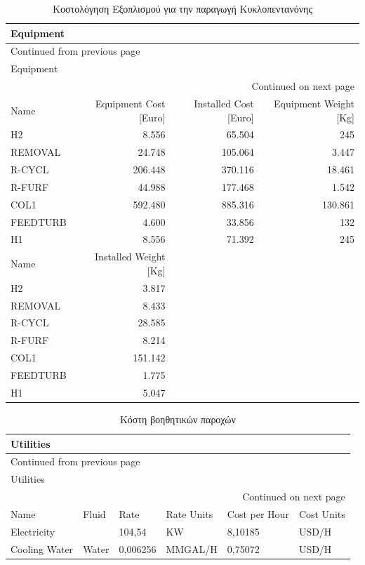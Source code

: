 \documentclass[11pt]{article}
\begin{document}
\begin{longtable}{lrrr}
\caption{Κοστολόγηση Εξοπλισμού για την παραγωγή Κυκλοπεντανόνης}
\\
Equipment &  &  & \\
\hline
\endfirsthead
\multicolumn{4}{l}{Continued from previous page} \\
\hline

Equipment &  &  &  \\

\hline
\endhead
\hline\multicolumn{4}{r}{Continued on next page} \\
\endfoot
\endlastfoot
\hline
Name & Equipment Cost [Euro] & Installed Cost [Euro] & Equipment Weight [Kg]\\
H2 & 8.556 & 65.504 & 245\\
REMOVAL & 24.748 & 105.064 & 3.447\\
R-CYCL & 206.448 & 370.116 & 18.461\\
R-FURF & 44.988 & 177.468 & 1.542\\
COL1 & 592.480 & 885.316 & 130.861\\
FEEDTURB & 4.600 & 33.856 & 132\\
H1 & 8.556 & 71.392 & 245\\
\hline
Name & Installed Weight [Kg] &  & \\
H2 & 3.817 &  & \\
REMOVAL & 8.433 &  & \\
R-CYCL & 28.585 &  & \\
R-FURF & 8.214 &  & \\
COL1 & 151.142 &  & \\
FEEDTURB & 1.775 &  & \\
H1 & 5.047 &  & \\
\end{longtable}

\begin{longtable}{llllll}
\caption{Κόστη βοηθητικών παροχών}
\\
Utilities &  &  &  &  & \\
\hline
\endfirsthead
\multicolumn{6}{l}{Continued from previous page} \\
\hline

Utilities &  &  &  &  &  \\

\hline
\endhead
\hline\multicolumn{6}{r}{Continued on next page} \\
\endfoot
\endlastfoot
\hline
Name & Fluid & Rate & Rate Units & Cost per Hour & Cost Units\\
Electricity &  & 104,54 & KW & 8,10185 & USD/H\\
Cooling Water & Water & 0,006256 & MMGAL/H & 0,75072 & USD/H\\
\end{longtable}
\end{document}
